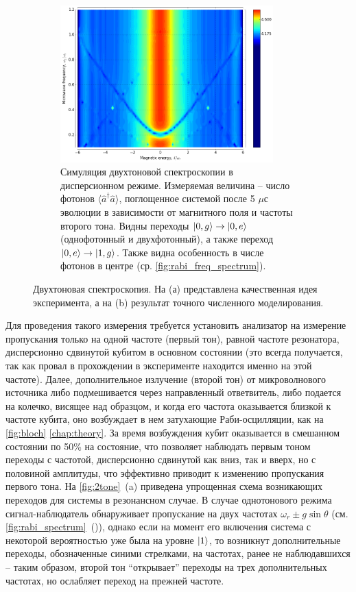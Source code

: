 \documentclass[12pt, twoside]{report}
\DeclarePairedDelimiter\ket{\lvert}{\rangle}
\numberwithin{equation}{section}
\numberwithin{figure}{section}
\begin{document}
\begin{figure}[h!]
\begin{subfigure}[b]{0.6\textwidth}
\includegraphics[width=0.9\textwidth]{Pictures/two_tone}
\caption{Симуляция двухтоновой спектроскопии в дисперсионном режиме. Измеряемая величина -- число фотонов $\langle \hat a^\dag \hat a \rangle$, поглощенное системой после 5 $\mu$с эволюции в зависимости от магнитного поля и частоты второго тона. Видны переходы $\ket{0, g}\rightarrow\ket{0, e}$ (однофотонный и двухфотонный), а также переход $\ket{0, e}\rightarrow\ket{1,g}$. Также видна особенность в числе фотонов в центре (ср. \autoref{fig:rabi_freq_spectrum}).}
\end{subfigure}
\caption{Двухтоновая спектроскопия. На (а) представлена качественная идея эксперимента, а на (b) результат точного численного моделирования.}
\label{fig:2tone}
\end{figure}
Для проведения такого измерения требуется установить анализатор на измерение пропускания только на одной частоте (первый тон), равной частоте резонатора, дисперсионно сдвинутой кубитом в основном состоянии (это всегда получается, так как провал в прохождении в эксперименте находится именно на этой частоте). Далее, дополнительное излучение (второй тон) от микроволнового источника либо подмешивается через направленный ответвитель, либо подается на колечко, висящее над образцом, и когда его частота оказывается близкой к частоте кубита, оно возбуждает в нем затухающие Раби-осцилляции, как на \autoref{fig:bloch} \autoref{chap:theory}. За время возбуждения кубит оказывается в смешанном состоянии по 50\% на состояние, что позволяет наблюдать первым тоном переходы с частотой, дисперсионно сдвинутой как вниз, так и вверх, но с половиной амплитуды, что эффективно приводит к изменению пропускания первого тона. На \autoref{fig:2tone}~(a) приведена упрощенная схема возникающих переходов для системы в резонансном случае. В случае однотонового режима сигнал-наблюдатель обнаруживает пропускание на двух частотах $\omega_r \pm g\sin \theta$ (см. \autoref{fig:rabi_spectrum}~()), однако если на момент его включения система с некоторой вероятностью уже была на уровне $\ket{1}$, то возникнут дополнительные переходы, обозначенные синими стрелками, на частотах, ранее не наблюдавшихся -- таким образом, второй тон ``открывает'' переходы на трех дополнительных частотах, но ослабляет переход на прежней частоте.
 
\end{document}
